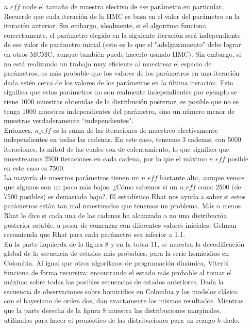 \documentclass[a4paper]{article}\usepackage[]{graphicx}\usepackage[]{color}
\begin{document}
$n\_eff$ mide el tamaño de muestra efectivo de ese parámetro en particular. Recuerde que cada iteración de la HMC se basa en el valor del parámetro en la iteración anterior. Sin embargo, idealmente, si el algoritmo funciona correctamente, el parámetro elegido en la siguiente iteración será independiente de ese valor de parámetro inicial (esto es lo que el "adelgazamiento" debe lograr en otros MCMC, aunque también puede hacerlo usando HMC). Sin embargo, si no está realizando un trabajo muy eficiente al muestrear el espacio de parámetros, es más probable que los valores de los parámetros en una iteración dada estén cerca de los valores de los parámetros en la última iteración. Esto significa que estos parámetros no son realmente independientes por ejemplo se tiene 1000 muestras obtenidas de la distribución posterior, es posible que no se tenga 1000 muestras independientes del parámetro, sino un número menor de muestras verdaderamente ``independientes".
\\
Entonces, $n\_eff$ es la suma de las iteraciones de muestreo efectivamente independientes en todas las cadenas. En este caso, tenemos 3 cadenas, con 5000 iteraciones, la mitad de las cuales son de calentamiento, lo que significa que muestreamos 2500 iteraciones en cada cadena, por lo que el máximo $n\_eff$ posible en este caso es 7500.
\\
La mayoría de nuestros parámetros tienen un $n\_eff$ bastante alto, aunque vemos que algunos son un poco más bajos. ¿Cómo sabemos si un $n\_eff$ como 2500 (de 7500 posibles) es demasiado bajo?. El estadístico Rhat nos ayuda a saber si estos parámetros están tan mal muestreados que tenemos un problema. Más o menos Rhat le dice si cada una de las cadenas ha alcanzado o no una distribución posterior estable, a pesar de comenzar con diferentes valores iniciales. Gelman recomienda que Rhat para cada parámetro sea inferior a 1.1.
\\
En la parte izquierda de la figura 8 y en la tabla 11, se muestra la decodificación global de la secuencia de estados más probables, para la serie homicidios en Colombia. Al igual que otros algoritmos de programación dinámica, Viterbi funciona de forma recursiva; encontrando el estado más probable al tomar el máximo sobre todas las posibles secuencias de estados anteriores. Dada la secuencia de observaciones sobre homicidios en Colombia y los modelos clásico con el bayesiano de orden dos, dan exactamente los mismos resultados. Mientras que la parte derecha de la figura 8 muestra las distribuciones marginales, utilizadas para hacer el pronóstico de las distribuciones para un rezago $h$ dado.
\end{document}
